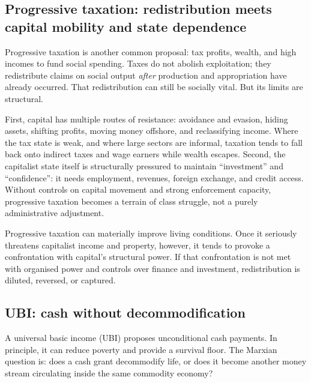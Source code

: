 \subsection{Progressive taxation: redistribution meets capital mobility and state dependence}
\label{sec:policy-taxation}

Progressive taxation is another common proposal: tax profits, wealth, and high
incomes to fund social spending. Taxes do not abolish exploitation; they
redistribute claims on social output \emph{after} production and appropriation
have already occurred. That redistribution can still be socially vital.
But its limits are structural.

First, capital has multiple routes of resistance: avoidance and evasion, hiding assets, shifting profits, moving money
offshore, and reclassifying income. Where the tax state is weak, and where large sectors are informal, taxation tends to
fall back onto indirect taxes and wage earners while wealth escapes. Second, the capitalist state itself is structurally
pressured to maintain ``investment'' and ``confidence'': it needs employment, revenues, foreign exchange, and credit
access. Without controls on capital movement and strong enforcement capacity, progressive taxation becomes a terrain of
class struggle, not a purely administrative adjustment.

Progressive taxation can materially improve living conditions. Once it
seriously threatens capitalist income and property, however, it tends to
provoke a confrontation with capital's structural power. If that confrontation is not met with organised
power and controls over finance and investment, redistribution is diluted, reversed, or captured.

\subsection{UBI: cash without decommodification}
\label{sec:policy-ubi}


A universal basic income (UBI) proposes unconditional cash payments. In principle, it can reduce poverty and provide
a survival floor. The Marxian question is: does a cash grant decommodify life, or does it become another money stream
circulating inside the same commodity economy?

